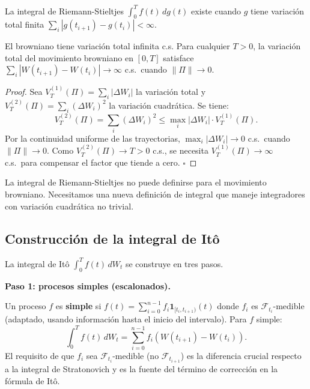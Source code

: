 La integral de Riemann-Stieltjes $\int_0^T f(t)\,dg(t)$ existe cuando
$g$ tiene variación total finita $\sum_i |g(t_{i+1})-g(t_i)| < \infty$.

\begin{proposicion}{El browniano tiene variación total infinita c.s.}
\label{prop:var_total}
Para cualquier $T > 0$, la variación total del movimiento browniano en $[0,T]$
satisface $\sum_i|W(t_{i+1})-W(t_i)| \to \infty$ c.s.\ cuando $\|\Pi\| \to 0$.
\end{proposicion}

\begin{proof}
Sea $V_T^{(1)}(\Pi) = \sum_i |\Delta W_i|$ la variación total y $V_T^{(2)}(\Pi)
= \sum_i (\Delta W_i)^2$ la variación cuadrática. Se tiene:
\[
  V_T^{(2)}(\Pi)
  = \sum_i (\Delta W_i)^2
  \leq \max_i|\Delta W_i| \cdot V_T^{(1)}(\Pi).
\]
Por la continuidad uniforme de las trayectorias, $\max_i|\Delta W_i| \to 0$ c.s.\
cuando $\|\Pi\| \to 0$. Como $V_T^{(2)}(\Pi) \to T > 0$ c.s., se necesita
$V_T^{(1)}(\Pi) \to \infty$ c.s.\ para compensar el factor que tiende a cero.
$\square$
\end{proof}

La integral de Riemann-Stieltjes no puede definirse para el movimiento browniano.
Necesitamos una nueva definición de integral que maneje integradores con variación
cuadrática no trivial.

\subsection{Construcción de la integral de Itô}
\label{subsec:construccion}

La integral de Itô $\int_0^T f(t)\,dW_t$ se construye en tres pasos.

\medskip
\noindent\textbf{Paso 1: procesos simples (escalonados).}

Un proceso $f$ es \textbf{simple} si $f(t) = \sum_{i=0}^{n-1} f_i
\mathbf{1}_{[t_i,t_{i+1})}(t)$ donde $f_i$ es $\mathcal{F}_{t_i}$-medible
(adaptado, usando información hasta el inicio del intervalo). Para $f$ simple:
\begin{equation}
  \int_0^T f(t)\,dW_t = \sum_{i=0}^{n-1} f_i(W(t_{i+1})-W(t_i)).
  \label{eq:ito_simple}
\end{equation}
El requisito de que $f_i$ sea $\mathcal{F}_{t_i}$-medible (no $\mathcal{F}_{t_{i+1}}$)
es la diferencia crucial respecto a la integral de Stratonovich y es la fuente
del término de corrección en la fórmula de Itô.

